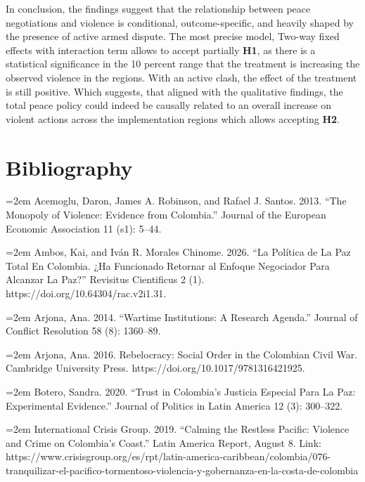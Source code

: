 \documentclass[11pt]{article}
\begin{document}
In conclusion, the findings suggest that the relationship between peace negotiations and violence is conditional, outcome-specific, and heavily shaped by the presence of active armed dispute. The most precise model, Two-way fixed effects with interaction term allows to accept partially \textbf{H1}, as there is a statistical significance in the 10 percent range that the treatment is increasing the observed violence in the regions. With an active clash, the effect of the treatment is still positive. Which suggests, that aligned with the qualitative findings, the total peace policy could indeed be causally related to an overall increase on violent actions across the implementation regions which allows accepting \textbf{H2}.  

\section{Bibliography}\label{Bilbiography}

\noindent
\hangindent=2em
Acemoglu, Daron, James A. Robinson, and Rafael J. Santos. 2013. “The Monopoly of Violence: Evidence from Colombia.” Journal of the European Economic Association 11 (s1): 5–44.

\noindent
\hangindent=2em
Ambos, Kai, and Iván R. Morales Chinome. 2026. “La Política de La Paz Total En Colombia. ¿Ha Funcionado Retornar al Enfoque Negociador Para Alcanzar La Paz?” Revisitus Cientificus 2 (1). https://doi.org/10.64304/rac.v2i1.31.

\noindent
\hangindent=2em
Arjona, Ana. 2014. “Wartime Institutions: A Research Agenda.” Journal of Conflict Resolution 58 (8): 1360–89.

\noindent
\hangindent=2em
Arjona, Ana. 2016. Rebelocracy: Social Order in the Colombian Civil War. Cambridge University Press. https://doi.org/10.1017/9781316421925.

\noindent
\hangindent=2em
Botero, Sandra. 2020. “Trust in Colombia’s Justicia Especial Para La Paz: Experimental Evidence.” Journal of Politics in Latin America 12 (3): 300–322.

\noindent
\hangindent=2em
International Crisis Group. 2019. “Calming the Restless Pacific:  Violence and Crime on Colombia’s Coast.” Latin America Report, August 8. Link: https://www.crisisgroup.org/es/rpt/latin-america-caribbean/colombia/076-tranquilizar-el-pacifico-tormentoso-violencia-y-gobernanza-en-la-costa-de-colombia
\end{document}
